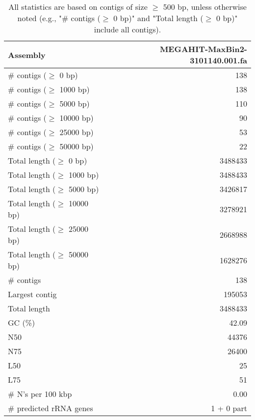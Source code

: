\documentclass[12pt,a4paper]{article}
\begin{document}
\begin{table}[ht]
\begin{center}
\caption{All statistics are based on contigs of size $\geq$ 500 bp, unless otherwise noted (e.g., "\# contigs ($\geq$ 0 bp)" and "Total length ($\geq$ 0 bp)" include all contigs).}
\begin{tabular}{|l*{1}{|r}|}
\hline
Assembly & MEGAHIT-MaxBin2-3101140.001.fa \\ \hline
\# contigs ($\geq$ 0 bp) & 138 \\ \hline
\# contigs ($\geq$ 1000 bp) & 138 \\ \hline
\# contigs ($\geq$ 5000 bp) & 110 \\ \hline
\# contigs ($\geq$ 10000 bp) & 90 \\ \hline
\# contigs ($\geq$ 25000 bp) & 53 \\ \hline
\# contigs ($\geq$ 50000 bp) & 22 \\ \hline
Total length ($\geq$ 0 bp) & 3488433 \\ \hline
Total length ($\geq$ 1000 bp) & 3488433 \\ \hline
Total length ($\geq$ 5000 bp) & 3426817 \\ \hline
Total length ($\geq$ 10000 bp) & 3278921 \\ \hline
Total length ($\geq$ 25000 bp) & 2668988 \\ \hline
Total length ($\geq$ 50000 bp) & 1628276 \\ \hline
\# contigs & 138 \\ \hline
Largest contig & 195053 \\ \hline
Total length & 3488433 \\ \hline
GC (\%) & 42.09 \\ \hline
N50 & 44376 \\ \hline
N75 & 26400 \\ \hline
L50 & 25 \\ \hline
L75 & 51 \\ \hline
\# N's per 100 kbp & 0.00 \\ \hline
\# predicted rRNA genes & 1 + 0 part \\ \hline
\end{tabular}
\end{center}
\end{table}
\end{document}
